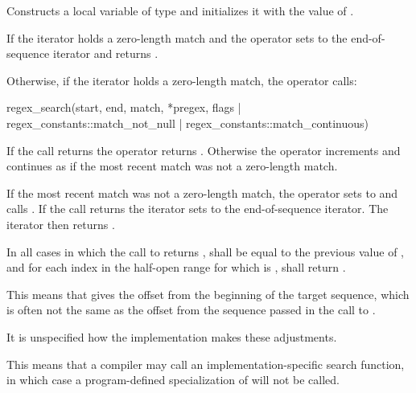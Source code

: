 \begin{itemdescr}
\pnum
\effects  Constructs a local variable  of type  and
initializes it with the value of .

\pnum
If the iterator holds a zero-length match and  the operator
sets  to the end-of-sequence iterator and returns .

\pnum
{}%
%
Otherwise, if the iterator holds a zero-length match, the operator calls:
\begin{codeblock}
regex_search(start, end, match, *pregex,
             flags | regex_constants::match_not_null | regex_constants::match_continuous)
\end{codeblock}
If the call returns  the operator
returns . Otherwise the operator increments  and continues as if
the most recent match was not a zero-length match.

\pnum
{}%
If the most recent match was not a zero-length match, the operator sets
 to  and
calls . If the call returns
 the iterator sets  to the end-of-sequence iterator. The
iterator then returns .

\pnum
In all cases in which the call to  returns ,
 shall be equal to the previous value of
, and for each index  in the half-open range
\tcode{[0, match.size())} for which  is ,
shall return .

\pnum
\begin{note} This means that  gives the
offset from the beginning of the target sequence, which is often not
the same as the offset from the sequence passed in the call
to . \end{note}

\pnum
It is unspecified how the implementation makes these adjustments.

\pnum
\begin{note} This means that a compiler may call an
implementation-specific search function, in which case a program-defined
specialization of  will not be
called. \end{note}
\end{itemdescr}

